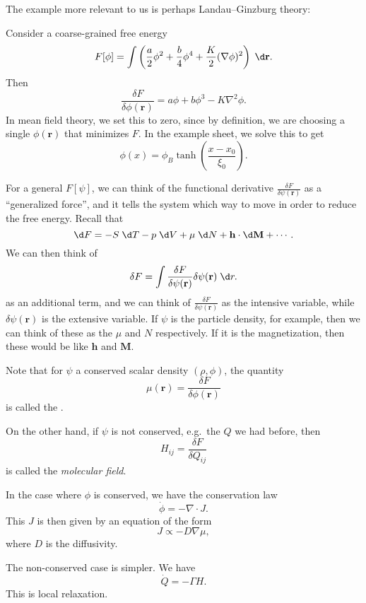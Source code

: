 \documentclass[a4paper]{article}
\begin{document}
The example more relevant to us is perhaps Landau--Ginzburg theory:
\begin{eg}
  Consider a coarse-grained free energy
  \[
    F[\phi] = \int \left(\frac{a}{2} \phi^2 + \frac{b}{4} \phi^4 + \frac{K}{2} (\nabla \phi)^2 \right)\;\d \mathbf{r}.
  \]
  Then
  \[
    \frac{\delta F}{\delta \phi(\mathbf{r})} = a \phi + b \phi^3 - K \nabla^2 \phi.
  \]
  In mean field theory, we set this to zero, since by definition, we are choosing a single $\phi(\mathbf{r})$ that minimizes $F$. In the example sheet, we solve this to get
  \[
    \phi(x) = \phi_B \tanh \left(\frac{x - x_0}{\xi_0}\right).
  \]
\end{eg}

For a general $F[\psi]$, we can think of the functional derivative $\frac{\delta F}{\delta \psi(\mathbf{r})}$ as a ``generalized force'', and it tells the system which way to move in order to reduce the free energy. Recall that
\[
  \d F = - S \;\d T - p \;\d V + \mu \;\d N + \mathbf{h} \cdot \d \mathbf{M} + \cdots.
\]
We can then think of
\[
  \delta F = \int \frac{\delta F}{\delta \psi(\mathbf{r})} \delta \psi(\mathbf{r})\;\d r.
\]
as an additional term, and we can think of $\frac{\delta F}{\delta \psi(\mathbf{r})}$ as the intensive variable, while $\delta \psi(\mathbf{r})$ is the extensive variable. If $\psi$ is the particle density, for example, then we can think of these as the $\mu$ and $N$ respectively. If it is the magnetization, then these would be like $\mathbf{h}$ and $\mathbf{M}$.

Note that for $\psi$ a conserved scalar density $(\rho, \phi)$, the quantity
\[
  \mu(\mathbf{r}) = \frac{\delta F}{\delta \phi(\mathbf{r})}
\]
is called the .

On the other hand, if $\psi$ is not conserved, e.g.\ the $Q$ we had before, then
\[
  H_{ij} = \frac{\delta F}{\delta Q_{ij}}
\]
is called the \emph{molecular field}.

In the case where $\phi$ is conserved, we have the conservation law
\[
  \dot{\phi} = - \nabla \cdot J.
\]
This $J$ is then given by an equation of the form
\[
  J \propto -D \nabla \mu,
\]
where $D$ is the diffusivity.

The non-conserved case is simpler. We have
\[
  \dot{Q} = - \Gamma H.
\]
This is local relaxation.
\end{document}
